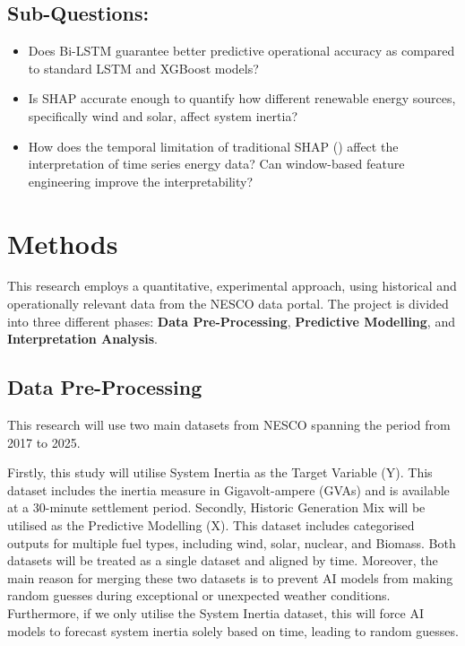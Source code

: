 \documentclass[12pt,a4paper,onecolumn]{article}
\begin{document}
\subsection{Sub-Questions:}
\begin{itemize}
\item Does Bi-LSTM guarantee better predictive operational accuracy as compared to standard LSTM and XGBoost models?
\item Is SHAP accurate enough to quantify how different renewable energy sources, specifically wind and solar, affect system inertia?
\item How does the temporal limitation of traditional SHAP (\cite{calero2025chronoshap}) affect the interpretation of time series energy data? Can window-based feature engineering improve the interpretability?
\end{itemize}


\section{Methods}
\label{sec:methods}
This research employs a quantitative, experimental approach, using historical and operationally relevant data from the NESCO data portal. The project is divided into three different phases: \textbf{Data Pre-Processing}, \textbf{Predictive Modelling}, and \textbf{Interpretation Analysis}.

\subsection{Data Pre-Processing} 
This research will use two main datasets from NESCO spanning the period from 2017 to 2025.

Firstly, this study will utilise System Inertia as the Target Variable (Y). This dataset includes the inertia measure in Gigavolt-ampere (GVAs) and is available at a 30-minute settlement period. Secondly, Historic Generation Mix will be utilised as the Predictive Modelling (X). This dataset includes categorised outputs for multiple fuel types, including wind, solar, nuclear, and Biomass. Both datasets will be treated as a single dataset and aligned by time. Moreover, the main reason for merging these two datasets is to prevent AI models from making random guesses during exceptional or unexpected weather conditions. Furthermore, if we only utilise the System Inertia dataset, this will force AI models to forecast system inertia solely based on time, leading to random guesses.
\end{document}

